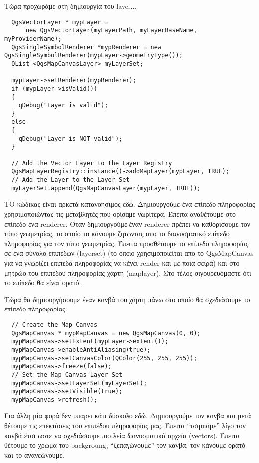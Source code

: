 Τώρα προχωράμε στη δημιουργία του layer... 

\begin{verbatim}
  QgsVectorLayer * mypLayer =
      new QgsVectorLayer(myLayerPath, myLayerBaseName, myProviderName);
  QgsSingleSymbolRenderer *mypRenderer = new
QgsSingleSymbolRenderer(mypLayer->geometryType());
  QList <QgsMapCanvasLayer> myLayerSet;

  mypLayer->setRenderer(mypRenderer);
  if (mypLayer->isValid())
  {
    qDebug("Layer is valid");
  }
  else
  {
    qDebug("Layer is NOT valid");
  }

  // Add the Vector Layer to the Layer Registry
  QgsMapLayerRegistry::instance()->addMapLayer(mypLayer, TRUE);
  // Add the Layer to the Layer Set
  myLayerSet.append(QgsMapCanvasLayer(mypLayer, TRUE));

\end{verbatim}

TΟ κώδικας είναι αρκετά κατανοήσιμος εδώ. Δημιουργούμε ένα επίπεδο πληροφορίας χρησιμοποιώντας τις μεταβλητές που ορίσαμε νωρίτερα. Έπειτα αναθέτουμε στο επίπεδο ένα renderer. Όταν δημιουργούμε έναν renderer πρέπει να καθορίσουμε τον τύπο γεωμετρίας, το οποίο το κάνουμε ζητώντας απο το διανυσματικό επίπεδο πληροφορίας για τον τύπο γεωμετρίας. Έπειτα προσθέτουμε το επίπεδο πληροφορίας σε ένα σύνολο επιπέδων (layerset) (το οποίο χρησιμοποιείται απο το QgsMapCanvas για να γνωρίζει επίπεδα πληροφορίας να κάνει render και με ποιά σειρά) και στο μητρώο του επιπέδου πληροφορίας χάρτη (maplayer). Στο τέλος σιγουρευόμαστε ότι το επίπεδο θα είναι ορατό. 

Τώρα θα δημιουργήσουμε έναν κανβά του χάρτη πάνω στο οποίο θα σχεδιάσουμε το επίπεδο πληροφορίας.

\begin{verbatim}
  // Create the Map Canvas
  QgsMapCanvas * mypMapCanvas = new QgsMapCanvas(0, 0);
  mypMapCanvas->setExtent(mypLayer->extent());
  mypMapCanvas->enableAntiAliasing(true);
  mypMapCanvas->setCanvasColor(QColor(255, 255, 255));
  mypMapCanvas->freeze(false);
  // Set the Map Canvas Layer Set
  mypMapCanvas->setLayerSet(myLayerSet);
  mypMapCanvas->setVisible(true);
  mypMapCanvas->refresh();

\end{verbatim}

Για άλλη μία φορά δεν υπαρει κάτι δύσκολο εδώ. Δημιουργούμε τον κανβα και μετά θέτουμε τις επεκτάσεις του επιπέδου πληροφορίας μας. Έπειτα “τσιμπάμε” λίγο τον κανβά έτσι ωστε να σχεδιάσουμε πιο λεία διανυσματικά αρχεία (vectors).  Έπειτα θέτουμε το χρώμα του backgroung, “ξεπαγώνουμε” τον κανβά, τον κάνουμε ορατό και το ανανεώνουμε.

